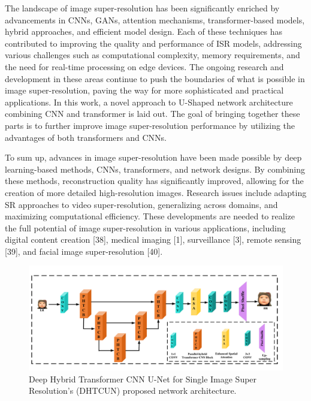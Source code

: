 \documentclass{ieeeaccess}
\begin{document}
The landscape of image super-resolution has been significantly enriched by advancements in CNNs, GANs, attention mechanisms, transformer-based models, hybrid approaches, and efficient model design. Each of these techniques has contributed to improving the quality and performance of ISR models, addressing various challenges such as computational complexity, memory requirements, and the need for real-time processing on edge devices. The ongoing research and development in these areas continue to push the boundaries of what is possible in image super-resolution, paving the way for more sophisticated and practical applications. In this work, a novel approach to U-Shaped network architecture combining CNN and transformer is laid out. The goal of bringing together these parts is to further improve image super-resolution performance by utilizing the advantages of both transformers and CNNs.

To sum up, advances in image super-resolution have been made possible by deep learning-based methods, CNNs, transformers, and network designs. By combining these methods, reconstruction quality has significantly improved, allowing for the creation of more detailed high-resolution images. Research issues include adapting SR approaches to video super-resolution, generalizing across domains, and maximizing computational efficiency. These developments are needed to realize the full potential of image super-resolution in various applications, including digital content creation [38], medical imaging [1], surveillance [3], remote sensing [39], and facial image super-resolution [40].


\begin{figure}
    \centering

    \includegraphics[width=\linewidth]{2Figure.pdf}
    \caption{Deep Hybrid Transformer CNN U-Net for Single Image Super Resolution's (DHTCUN) proposed network architecture.}
    \label{fig:1}
\end{figure}
\end{document}

